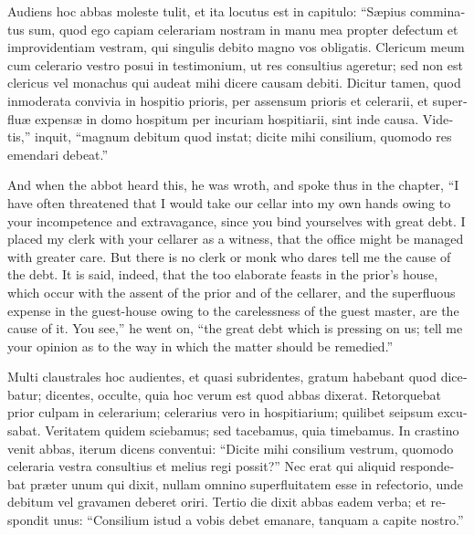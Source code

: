 \documentclass[10pt]{book}
\begin{document}
\begin{paracol}{2}
\switchcolumn*

\begin{otherlanguage}{latin}
Audiens hoc abbas moleste tulit, et ita locutus est in capitulo: ``S\ae{}pius comminatus sum, quod  ego capiam celerariam nostram in manu mea propter defectum et improvidentiam vestram, qui singulis debito magno vos obligatis. Clericum meum cum celerario vestro posui in testimonium, ut res consultius ageretur; sed non est clericus vel monachus qui audeat mihi dicere causam debiti. Dicitur tamen, quod inmoderata convivia in hospitio prioris, per assensum prioris et celerarii, et superflu\ae{} expens\ae{} in domo hospitum per incuriam hospitiarii, sint inde causa. Videtis,'' inquit, ``magnum debitum quod instat; dicite mihi consilium, quomodo res emendari debeat.''
\end{otherlanguage}

\switchcolumn

And when the abbot heard this, he was wroth, and spoke thus in the chapter, ``I have often threatened that I would take our cellar into my own hands owing to your incompetence and extravagance, since you bind yourselves with great debt. I placed my clerk with your cellarer as a witness, that the office might be managed with greater care. But there is no clerk or monk who dares tell me the cause of the debt. It is said, indeed, that the too elaborate feasts in the prior's house, which occur with the assent of the prior and of the cellarer, and the superfluous expense in the guest-house owing to the carelessness of the guest master, are the cause of it. You see,'' he went on, ``the great debt which is pressing on us; tell me your opinion as to the way in which the matter should be remedied.''

\switchcolumn*

\begin{otherlanguage}{latin}
Multi claustrales hoc audientes, et quasi subridentes, gratum habebant quod dicebatur; dicentes, occulte, quia hoc verum est quod abbas dixerat. Retorquebat prior culpam in celerarium; celerarius vero in hospitiarium; quilibet seipsum excusabat. Veritatem quidem sciebamus; sed tacebamus, quia timebamus. In crastino venit abbas, iterum dicens conventui: ``Dicite mihi consilium vestrum, quomodo celeraria vestra consultius et melius regi possit?'' Nec erat qui aliquid respondebat pr\ae{}ter unum qui dixit, nullam omnino superfluitatem esse in refectorio, unde debitum vel gravamen deberet oriri. Tertio die dixit abbas eadem verba; et respondit unus: ``Consilium istud a vobis debet emanare, tanquam a capite nostro.''
\end{otherlanguage}


\end{paracol}
\end{document}
